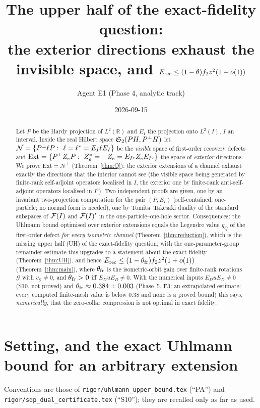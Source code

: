 \documentclass[11pt]{article}
\title{The upper half of the exact-fidelity question:\\
\large the exterior directions exhaust the invisible space, and
$\Erec\le(1-\theta)f_2z^2(1+o(1))$}
\author{Agent E1 (Phase 4, analytic track)}\date{2026-09-15}
\newcommand{\Stwo}{\mathfrak S_2}\newcommand{\Sone}{\mathfrak S_1}
\newcommand{\Ext}{\mathrm{Ext}}\newcommand{\Nvis}{\mathcal N}
\newcommand{\Erec}{E_{\mathrm{rec}}}\newcommand{\Gs}{\mathcal G}
\begin{document}
\maketitle
\begin{abstract}
Let $P$ be the Hardy projection of $L^2(\mathbb R)$ and $E_I$ the projection onto $L^2(I)$,
$I$ an interval.  Inside the real Hilbert space $\Stwo(PH,\Pperp H)$ let
$\Nvis=\{\Pperp\ell P:\ \ell=\ell^*=E_I\ell E_I\}$ be the \emph{visible} space of first-order
recovery defects and $\Ext=\{\Pperp Z_eP:\ Z_e^*=-Z_e=E_{I^c}Z_eE_{I^c}\}$ the space of
\emph{exterior} directions.  We prove $\overline{\Ext}=\Nvis^{\perp}$
(Theorem~\ref{thm:Q}): the exterior extensions of a channel exhaust exactly the directions
that the interior cannot see (the visible space being generated by finite-rank self-adjoint operators localised in $I$, the exterior one by finite-rank anti-self-adjoint operators localised in $I^c$).  Two independent proofs are given, one by an invariant two-projection computation for the pair $(P,E_I)$ (self-contained, one-particle; no normal form is needed), one by
Tomita--Takesaki duality of the standard subspaces of $\mathcal F(I)$ and $\mathcal F(I)'$ in the
one-particle--one-hole sector.  Consequences: the Uhlmann bound optimised over exterior
extensions equals the Legendre value $g_Q$ of the first-order defect \emph{for every
isometric channel} (Theorem~\ref{thm:reduction}), which is the missing upper half (UH) of the
exact-fidelity question; with the one-parameter-group remainder estimate this upgrades to a
statement about the exact fidelity (Theorem~\ref{thm:UH}), and hence $\Erec\le(1-\theta_{\rm fr})f_2z^2(1+o(1))$
(Theorem~\ref{thm:main}), where $\theta_{\rm fr}$ is the isometric-orbit gain over finite-rank
rotations $\Gs$ with $v_\Gs\ne0$, and $\theta_{\rm fr}>0$ iff $E_DuE_D\ne0$.  With the numerical inputs
$E_DuE_D\ne0$ (S10, not proved) and $\theta_{\rm fr}\approx0.384\pm0.003$ (Phase~5, F3: an extrapolated estimate; every computed finite-mesh value is below $0.38$ and none is a proved bound) this says, \emph{numerically}, that the zero-collar
compression is not optimal in exact fidelity.
\end{abstract}
\tableofcontents
\section{Setting, and the exact Uhlmann bound for an arbitrary extension}\label{sec:setting}

Conventions are those of \texttt{rigor/uhlmann\_upper\_bound.tex} (``PA'') and
\texttt{rigor/sdp\_dual\_certificate.tex} (``S10''); they are recalled only as far as used.
\end{document}
